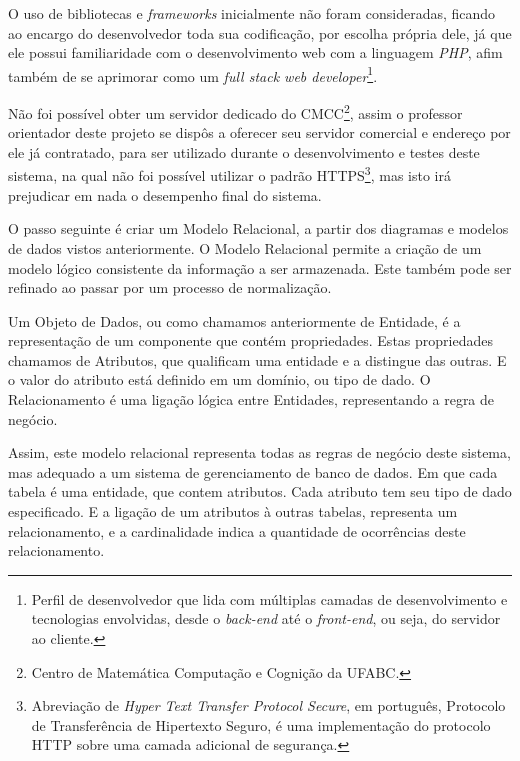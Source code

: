 \documentclass[
	12pt,				%
	openany,
	oneside,
	a4paper,			%
	english,			%
	brazil				%
	]{abntex2}
\begin{document}
  O uso de bibliotecas e \textit{frameworks} inicialmente não foram consideradas, ficando ao encargo do desenvolvedor toda sua codificação, por escolha própria dele, já que ele possui familiaridade com o desenvolvimento web com a linguagem \textit{PHP}, afim também de se aprimorar como um \textit{full stack web developer}\footnote{Perfil de desenvolvedor que lida com múltiplas camadas de desenvolvimento e tecnologias envolvidas, desde o \textit{back-end} até o \textit{front-end}, ou seja, do servidor ao cliente.}.

  Não foi possível obter um servidor dedicado do CMCC\footnote{Centro de Matemática Computação e Cognição da UFABC.}, assim o professor orientador deste projeto se dispôs a oferecer seu servidor comercial e endereço por ele já contratado, para ser utilizado durante o desenvolvimento e testes deste sistema, na qual não foi possível utilizar o padrão HTTPS\footnote{Abreviação de \textit{Hyper Text Transfer Protocol Secure}, em português, Protocolo de Transferência de Hipertexto Seguro, é uma implementação do protocolo HTTP sobre uma camada adicional de segurança.}, mas isto irá prejudicar em nada o desempenho final do sistema.

  O passo seguinte é criar um Modelo Relacional, a partir dos diagramas e modelos de dados vistos anteriormente. O Modelo Relacional permite a criação de um modelo lógico consistente da informação a ser armazenada. Este também pode ser refinado ao passar por um processo de normalização.

  Um Objeto de Dados, ou como chamamos anteriormente de Entidade, é a representação de um componente que contém propriedades. Estas propriedades chamamos de Atributos, que qualificam uma entidade e a distingue das outras. E o valor do atributo está definido em um domínio, ou tipo de dado. O Relacionamento é uma ligação lógica entre Entidades, representando a regra de negócio.

  Assim, este modelo relacional representa todas as regras de negócio deste sistema, mas adequado a um sistema de gerenciamento de banco de dados. Em que cada tabela é uma entidade, que contem atributos. Cada atributo tem seu tipo de dado especificado. E a ligação de um atributos à outras tabelas, representa um relacionamento, e a cardinalidade indica a quantidade de ocorrências deste relacionamento.
\end{document}
